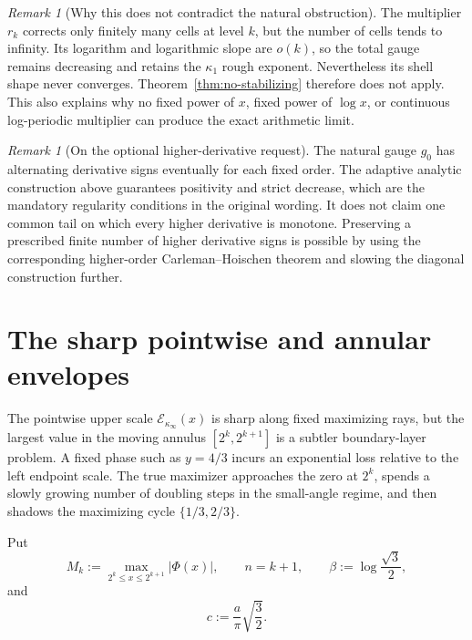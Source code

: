 \documentclass[11pt]{article}
\theoremstyle{definition}
\theoremstyle{remark}
\newtheorem{remark}[theorem]{Remark}
\newcommand{\Ecal}{\mathcal E}
\begin{document}
\begin{remark}[Why this does not contradict the natural obstruction]
The multiplier \(r_k\) corrects only finitely many cells at level \(k\), but
the number of cells tends to infinity.  Its logarithm and logarithmic slope
are \(o(k)\), so the total gauge remains decreasing and retains the
\(\kappa_1\) rough exponent.  Nevertheless its shell shape never converges.
Theorem~\ref{thm:no-stabilizing} therefore does not apply.  This also explains
why no fixed power of \(x\), fixed power of \(\log x\), or continuous
log-periodic multiplier can produce the exact arithmetic limit.
\end{remark}

\begin{remark}[On the optional higher-derivative request]
The natural gauge \(g_0\) has alternating derivative signs eventually for
each fixed order.  The adaptive analytic construction above guarantees
positivity and strict decrease, which are the mandatory regularity conditions
in the original wording.  It does not claim one common tail on which every
higher derivative is monotone.  Preserving a prescribed finite number of
higher derivative signs is possible by using the corresponding higher-order
Carleman--Hoischen theorem and slowing the diagonal construction further.
\end{remark}

\section{The sharp pointwise and annular envelopes}
\label{sec:annular}

The pointwise upper scale \(\Ecal_{\kappa_\infty}(x)\) is sharp along fixed
maximizing rays, but the largest value in the moving annulus
\([2^k,2^{k+1}]\) is a subtler boundary-layer problem.  A fixed phase such as
\(y=4/3\) incurs an exponential loss relative to the left endpoint scale.
The true maximizer approaches the zero at \(2^k\), spends a slowly growing
number of doubling steps in the small-angle regime, and then shadows the
maximizing cycle \(\{1/3,2/3\}\).

Put
\begin{equation}
 M_k:=\max_{2^k\le x\le2^{k+1}}|\Phi(x)|,
 \qquad n=k+1,
 \qquad
 \beta:=\log\frac{\sqrt3}{2},
 \label{eq:Mk-beta}
\end{equation}
and
\begin{equation}
 c:=\frac{a}{\pi}\sqrt{\frac32}.
 \label{eq:c}
\end{equation}
\end{document}
